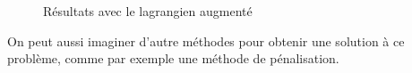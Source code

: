 \documentclass[10pt,a4paper]{article}
\theoremstyle{plain}
\theoremstyle{definition}
\begin{document}
\begin{figure}
\centering
{}
\caption{Résultats avec le lagrangien augmenté}
\label{fig:aug}
\end{figure}



On peut aussi imaginer d'autre méthodes pour obtenir une solution à ce problème, comme par exemple une méthode de pénalisation.




\end{document}
